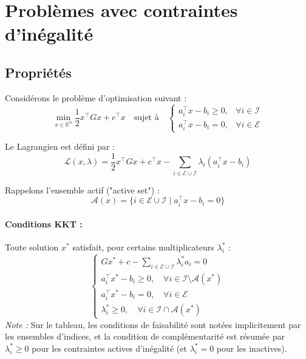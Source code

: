 \section{Problèmes avec contraintes d'inégalité}

\subsection{Propriétés}


Considérons le problème d'optimisation suivant :
    \begin{equation}
        \min_{x \in \mathbb{R}^n} \frac{1}{2} x^\top G x + c^\top x \quad \text{sujet à} \quad
        \begin{cases}
            a_i^\top x - b_i \ge 0, & \forall i \in \mathcal{I} \\
            a_i^\top x - b_i = 0, & \forall i \in \mathcal{E}
        \end{cases}
    \end{equation}

    Le Lagrangien est défini par :
    \begin{equation}
        \mathcal{L}(x, \lambda) = \frac{1}{2} x^\top G x + c^\top x - \sum_{i \in \mathcal{E} \cup \mathcal{I}} \lambda_i (a_i^\top x - b_i)
    \end{equation}

    Rappelons l'ensemble actif ("active set") :
    \begin{equation}
        \mathcal{A}(x) = \{ i \in \mathcal{E} \cup \mathcal{I} \mid a_i^\top x - b_i = 0 \}
    \end{equation}

    \paragraph{Conditions KKT :}
    Toute solution $x^*$ satisfait, pour certains multiplicateurs $\lambda_i^*$ :
    \begin{equation}
        \begin{cases}
            G x^* + c - \sum_{i \in \mathcal{E} \cup \mathcal{I}} \lambda_i^* a_i = 0 \\
            a_i^\top x^* - b_i \ge 0, \quad \forall i \in \mathcal{I} \setminus \mathcal{A}(x^*) \\
            a_i^\top x^* - b_i = 0, \quad \forall i \in \mathcal{E} \\
            \lambda_i^* \ge 0, \quad \forall i \in \mathcal{I} \cap \mathcal{A}(x^*)
        \end{cases}
    \end{equation}
    \emph{Note :} Sur le tableau, les conditions de faisabilité sont notées implicitement par les ensembles d'indices, et la condition de complémentarité est résumée par $\lambda_i^* \ge 0$ pour les contraintes actives d'inégalité (et $\lambda_i^* = 0$ pour les inactives).

